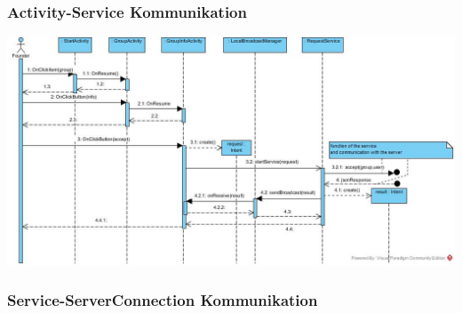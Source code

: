 \subsubsection{Activity-Service Kommunikation}

\includegraphics[width=1.1\textwidth]{Activity_Service.jpg}
	

\subsubsection{Service-ServerConnection Kommunikation}

